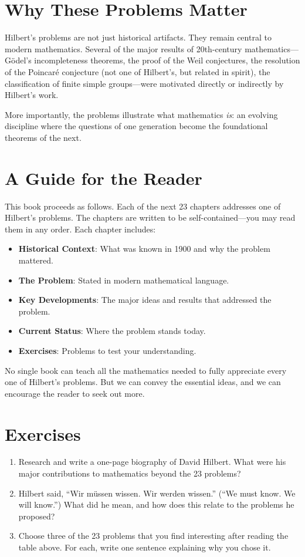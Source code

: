 \section{Why These Problems Matter}

Hilbert's problems are not just historical artifacts. They remain central to modern mathematics. Several of the major results of 20th-century mathematics---G\"odel's incompleteness theorems, the proof of the Weil conjectures, the resolution of the Poincar\'e conjecture (not one of Hilbert's, but related in spirit), the classification of finite simple groups---were motivated directly or indirectly by Hilbert's work.

More importantly, the problems illustrate what mathematics \emph{is}: an evolving discipline where the questions of one generation become the foundational theorems of the next.

\section{A Guide for the Reader}

This book proceeds as follows. Each of the next 23 chapters addresses one of Hilbert's problems. The chapters are written to be self-contained---you may read them in any order. Each chapter includes:

\begin{itemize}
    \item \textbf{Historical Context}: What was known in 1900 and why the problem mattered.
    \item \textbf{The Problem}: Stated in modern mathematical language.
    \item \textbf{Key Developments}: The major ideas and results that addressed the problem.
    \item \textbf{Current Status}: Where the problem stands today.
    \item \textbf{Exercises}: Problems to test your understanding.
\end{itemize}

No single book can teach all the mathematics needed to fully appreciate every one of Hilbert's problems. But we can convey the essential ideas, and we can encourage the reader to seek out more.

\section*{Exercises}

\begin{enumerate}
    \item Research and write a one-page biography of David Hilbert. What were his major contributions to mathematics beyond the 23 problems?

    \item Hilbert said, ``Wir m\"ussen wissen. Wir werden wissen.'' (``We must know. We will know.'') What did he mean, and how does this relate to the problems he proposed?

    \item Choose three of the 23 problems that you find interesting after reading the table above. For each, write one sentence explaining why you chose it.
\end{enumerate}
